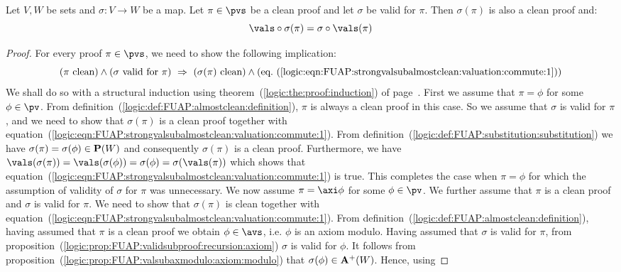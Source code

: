 \begin{prop}\label{logic:prop:FUAP:strongvalsubalmostclean:valuation:commute}
Let $V,W$ be sets and $\sigma:V\to W$ be a map. Let $\pi\in\pvs$ be
a clean proof  and let $\sigma$ be valid for $\pi$. Then
$\sigma(\pi)$ is also a clean proof and:
    \begin{equation}\label{logic:eqn:FUAP:strongvalsubalmostclean:valuation:commute:1}
    \vals\circ\sigma(\pi)=\sigma\circ\vals(\pi)
    \end{equation}
\end{prop}
\begin{proof}
For every proof $\pi\in\pvs$, we need to show the following
implication:
    \[
    (\mbox{$\pi$ clean})\land(\mbox{$\sigma$ valid for $\pi$})
    \ \Rightarrow\ (\mbox{$\sigma(\pi)$ clean})
    \land(\mbox{eq.~(\ref{logic:eqn:FUAP:strongvalsubalmostclean:valuation:commute:1})})
    \]
We shall do so with a structural induction using
theorem~(\ref{logic:the:proof:induction}) of
page~\pageref{logic:the:proof:induction}. First we assume that
$\pi=\phi$ for some $\phi\in\pv$. From
definition~(\ref{logic:def:FUAP:almostclean:definition}), $\pi$ is
always a clean proof in this case. So we assume that $\sigma$ is
valid for $\pi$, and we need to show that $\sigma(\pi)$ is a clean
proof together with
equation~(\ref{logic:eqn:FUAP:strongvalsubalmostclean:valuation:commute:1}).
From definition~(\ref{logic:def:FUAP:substitution:substitution}) we
have $\sigma(\pi)=\sigma(\phi)\in{\bf P}(W)$ and consequently
$\sigma(\pi)$ is a clean proof. Furthermore, we have
$\vals(\sigma(\pi))=\vals(\sigma(\phi))=\sigma(\phi)=\sigma(\vals(\pi))$
which shows that
equation~(\ref{logic:eqn:FUAP:strongvalsubalmostclean:valuation:commute:1})
is true. This completes the case when $\pi=\phi$ for which the
assumption of validity of $\sigma$ for $\pi$ was unnecessary. We now
assume $\pi=\axi\phi$ for some $\phi\in\pv$. We further assume that
$\pi$ is a clean proof and $\sigma$ is valid for $\pi$. We need to
show that $\sigma(\pi)$ is clean together with
equation~(\ref{logic:eqn:FUAP:strongvalsubalmostclean:valuation:commute:1}).
From definition~(\ref{logic:def:FUAP:almostclean:definition}),
having assumed that $\pi$ is a clean proof we obtain $\phi\in\avs$,
i.e. $\phi$ is an axiom modulo. Having assumed that $\sigma$ is
valid for $\pi$, from
proposition~(\ref{logic:prop:FUAP:validsubproof:recursion:axiom})
$\sigma$ is valid for $\phi$. It follows from
proposition~(\ref{logic:prop:FUAP:valsubaxmodulo:axiom:modulo}) that
$\sigma(\phi)\in{\bf A}^{+}(W)$. Hence, using

\end{proof}
